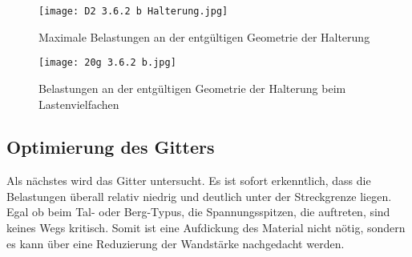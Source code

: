 \begin{figure}[h]
	\begin{minipage}[t]{0.5\linewidth}
		\centering
		\texttt{[image: D2 3.6.2 b Halterung.jpg]}
		\caption{Maximale Belastungen an der entgültigen Geometrie der Halterung}
		\label{abb_Halterung_max}
	\end{minipage}
	\hfill
	\begin{minipage}[t]{0.41\linewidth}
		\centering
		\texttt{[image: 20g 3.6.2 b.jpg]}
		\caption{Belastungen an der entgültigen Geometrie der Halterung beim Lastenvielfachen}
		\label{abb_Halterung_20g}
	\end{minipage}
\end{figure}
\subsection{Optimierung des Gitters}
Als nächstes wird das Gitter untersucht. Es ist sofort erkenntlich, dass die Belastungen überall relativ niedrig und deutlich unter der Streckgrenze liegen. Egal ob beim Tal- oder Berg-Typus, die Spannungsspitzen, die auftreten, sind keines Wegs kritisch. Somit ist eine Aufdickung des Material nicht nötig, sondern es kann über eine Reduzierung der Wandstärke nachgedacht werden.

